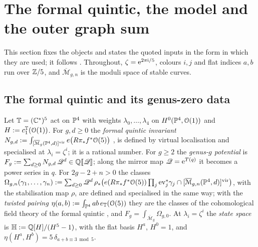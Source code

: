 \section{The formal quintic, the model and the outer graph sum}
\label{sec:set}

This section fixes the objects and states the quoted inputs in the form in which they are used; it follows . Throughout, $\zeta=\mathrm{e}^{2\pi\mathrm{i}/5}$, colours $i,j$ and flat indices $a,b$ run over $\mathbb{Z}/5$, and $\overline{\mathcal M}_{g,n}$ is the moduli space of stable curves.

\subsection{The formal quintic and its genus-zero data}
\label{sec:set-fq}

\begin{defn}
\label{def:set-fq}
Let $\mathbb{T}=(\mathbb{C}^*)^5$ act on $\mathbb{P}^4$ with weights $\lambda_0,\dots,\lambda_4$ on $H^0(\mathbb{P}^4,\mathcal{O}(1))$ and $H:=c_1^{\mathbb{T}}(\mathcal{O}(1))$. For $g,d\geq0$ the \emph{formal quintic invariant} $N_{g,d}:=\int_{[\overline{\mathcal M}_g(\mathbb{P}^4,d)]^{\mathrm{vir}}}e\bigl(R\pi_*f^*\mathcal{O}(5)\bigr)$ \cite[\S0.2, (5)]{LP18}, \cite[\S0.2, (5)]{LP20} is defined by virtual localisation \cite{MR1666787} and specialised at $\lambda_i=\zeta^i$; it is a rational number. For $g\geq2$ the \emph{genus-$g$ potential} is $F_g:=\sum_{d\geq0}N_{g,d}\,\mathscr{Q}^d\in\mathbb{Q}[\![ \mathscr{Q} ]\!]$; along the mirror map $\mathscr{Q}=\mathrm{e}^{T(q)}$ it becomes a power series in $q$. For $2g-2+n>0$ the classes $\Omega_{g,n}(\gamma_1,\dots,\gamma_n):=\sum_{d\geq0}\mathscr{Q}^d\,\rho_*\bigl(e(R\pi_*f^*\mathcal{O}(5))\prod_{j}\mathrm{ev}_j^*\gamma_j\cap[\overline{\mathcal M}_{g,n}(\mathbb{P}^4,d)]^{\mathrm{vir}}\bigr)$, with the stabilisation map $\rho$, are defined and specialised in the same way; with the \emph{twisted pairing} $\eta(a,b):=\int_{\mathbb{P}^4}ab\,e_{\mathbb{T}}(\mathcal{O}(5))$ they are the classes of the cohomological field theory of the formal quintic \cite[\S4.1]{GJR18}, and $F_g=\int_{\overline{\mathcal M}_g}\Omega_{g,0}$. At $\lambda_i=\zeta^i$ the \emph{state space} is $\mathbb{H}:=\mathbb{Q}[H]/(H^5-1)$, with the flat basis $H^a$, $H^0=1$, and $\eta(H^a,H^b)=5\,\delta_{a+b\equiv3\bmod5}$.
\end{defn}

